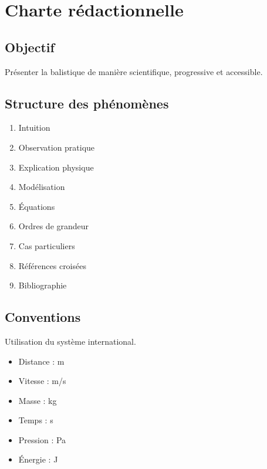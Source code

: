 \chapter*{Charte rédactionnelle}

\section*{Objectif}

Présenter la balistique de manière scientifique, progressive et accessible.

\section*{Structure des phénomènes}

\begin{enumerate}
\item Intuition
\item Observation pratique
\item Explication physique
\item Modélisation
\item Équations
\item Ordres de grandeur
\item Cas particuliers
\item Références croisées
\item Bibliographie
\end{enumerate}

\section*{Conventions}

Utilisation du système international.

\begin{itemize}
\item Distance : m
\item Vitesse : m/s
\item Masse : kg
\item Temps : s
\item Pression : Pa
\item Énergie : J
\end{itemize}
